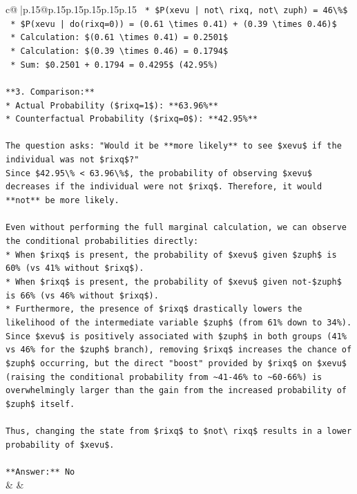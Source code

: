 \documentclass{article}
\begin{document}
{\begin{supertabular}{c@{$\;$}|p{.15\linewidth}@{}p{.15\linewidth}p{.15\linewidth}p{.15\linewidth}p{.15\linewidth}p{.15\linewidth}}
{{{\texttt{        *   \$P(xevu | not\textbackslash{} rixq, not\textbackslash{} zuph) = 46\textbackslash{}\%\$} \\
\texttt{    *   \$P(xevu | do(rixq=0)) = (0.61 \textbackslash{}times 0.41) + (0.39 \textbackslash{}times 0.46)\$} \\
\texttt{    *   Calculation: \$(0.61 \textbackslash{}times 0.41) = 0.2501\$} \\
\texttt{    *   Calculation: \$(0.39 \textbackslash{}times 0.46) = 0.1794\$} \\
\texttt{    *   Sum: \$0.2501 + 0.1794 = 0.4295\$ (42.95\%)} \\
\\ 
\texttt{**3. Comparison:**} \\
\texttt{*   Actual Probability (\$rixq=1\$): **63.96\%**} \\
\texttt{*   Counterfactual Probability (\$rixq=0\$): **42.95\%**} \\
\\ 
\texttt{The question asks: "Would it be **more likely** to see \$xevu\$ if the individual was not \$rixq\$?"} \\
\texttt{Since \$42.95\textbackslash{}\% < 63.96\textbackslash{}\%\$, the probability of observing \$xevu\$ decreases if the individual were not \$rixq\$. Therefore, it would **not** be more likely.} \\
\\ 
\texttt{Even without performing the full marginal calculation, we can observe the conditional probabilities directly:} \\
\texttt{*   When \$rixq\$ is present, the probability of \$xevu\$ given \$zuph\$ is 60\% (vs 41\% without \$rixq\$).} \\
\texttt{*   When \$rixq\$ is present, the probability of \$xevu\$ given not{-}\$zuph\$ is 66\% (vs 46\% without \$rixq\$).} \\
\texttt{*   Furthermore, the presence of \$rixq\$ drastically lowers the likelihood of the intermediate variable \$zuph\$ (from 61\% down to 34\%). Since \$xevu\$ is positively associated with \$zuph\$ in both groups (41\% vs 46\% for the \$zuph\$ branch), removing \$rixq\$ increases the chance of \$zuph\$ occurring, but the direct "boost" provided by \$rixq\$ on \$xevu\$ (raising the conditional probability from \textasciitilde{}41{-}46\% to \textasciitilde{}60{-}66\%) is overwhelmingly larger than the gain from the increased probability of \$zuph\$ itself.} \\
\\ 
\texttt{Thus, changing the state from \$rixq\$ to \$not\textbackslash{} rixq\$ results in a lower probability of \$xevu\$.} \\
\\ 
\texttt{**Answer:** No} \\
            }
        }
    }
    & & \\ \\


\end{supertabular}}
\end{document}

